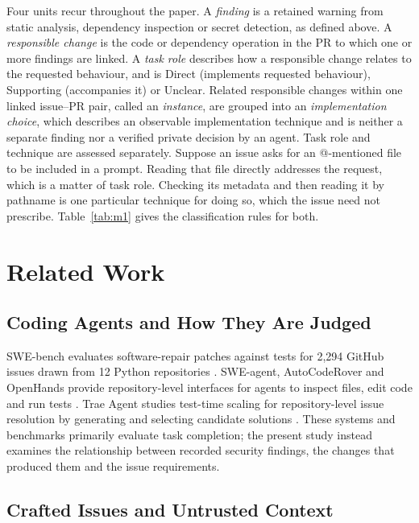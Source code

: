 \documentclass[acmsmall,screen,nonacm,review]{acmart}
\begin{document}
Four units recur throughout the paper. A \emph{finding} is a retained warning from static analysis, dependency inspection or secret detection, as defined above. A \emph{responsible change} is the code or dependency operation in the PR to which one or more findings are linked. A \emph{task role} describes how a responsible change relates to the requested behaviour, and is Direct (implements requested behaviour), Supporting (accompanies it) or Unclear. Related responsible changes within one linked issue--PR pair, called an \emph{instance}, are grouped into an \emph{implementation choice}, which describes an observable implementation technique and is neither a separate finding nor a verified private decision by an agent. Task role and technique are assessed separately. Suppose an issue asks for an @-mentioned file to be included in a prompt. Reading that file directly addresses the request, which is a matter of task role. Checking its metadata and then reading it by pathname is one particular technique for doing so, which the issue need not prescribe. Table~\ref{tab:m1} gives the classification rules for both.

\section{Related Work}\label{sec:related}

\subsection{Coding Agents and How They Are Judged}

SWE-bench evaluates software-repair patches against tests for 2,294 GitHub issues drawn from 12 Python repositories \cite{b9}. SWE-agent, AutoCodeRover and OpenHands provide repository-level interfaces for agents to inspect files, edit code and run tests \cite{b22,b25,b20}. Trae Agent studies test-time scaling for repository-level issue resolution by generating and selecting candidate solutions \cite{b47}. These systems and benchmarks primarily evaluate task completion; the present study instead examines the relationship between recorded security findings, the changes that produced them and the issue requirements.

\subsection{Crafted Issues and Untrusted Context}
\end{document}
